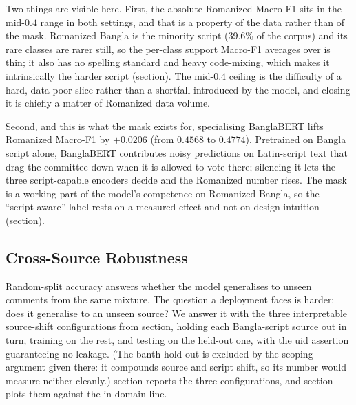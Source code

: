\documentclass[11pt,a4paper]{article}
\def\dset#1{#1}%
\def\cref#1{section}%
\def\texttt#1{#1}%
\def\textsc#1{#1}%
\def\emph#1{#1}%
\providecommand{\dset}[1]{\textsc{#1}}
\begin{document}
Two things are visible here. First, the absolute Romanized Macro-F1 sits in the mid-$0.4$ range in both settings, and that is a property of the data rather than of the mask. Romanized Bangla is the minority script (39.6\% of the corpus) and its rare classes are rarer still, so the per-class support Macro-F1 averages over is thin; it also has no spelling standard and heavy code-mixing, which makes it intrinsically the harder script (\cref{sec:rw-script}). The mid-$0.4$ ceiling is the difficulty of a hard, data-poor slice rather than a shortfall introduced by the model, and closing it is chiefly a matter of Romanized data volume.

Second, and this is what the mask exists for, specialising BanglaBERT lifts Romanized Macro-F1 by $+0.0206$ (from $0.4568$ to $0.4774$). Pretrained on Bangla script alone, BanglaBERT contributes noisy predictions on Latin-script text that drag the committee down when it is allowed to vote there; silencing it lets the three script-capable encoders decide and the Romanized number rises. The mask is a working part of the model's competence on Romanized Bangla, so the ``script-aware'' label rests on a measured effect and not on design intuition (\cref{sec:limitations}).

\subsection{Cross-Source Robustness}
\label{sec:robustness-results}

Random-split accuracy answers whether the model generalises to unseen comments from the same mixture. The question a deployment faces is harder: does it generalise to an unseen \emph{source}? We answer it with the three interpretable source-shift configurations from \cref{sec:splits}, holding each Bangla-script source out in turn, training on the rest, and testing on the held-out one, with the \texttt{uid} assertion guaranteeing no leakage. (The \dset{banth} hold-out is excluded by the scoping argument given there: it compounds source and script shift, so its number would measure neither cleanly.) \cref{tab:robustness} reports the three configurations, and \cref{fig:robustness} plots them against the in-domain line.
\end{document}
